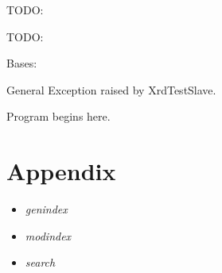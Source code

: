 \documentclass[a4paper,11pt,openany]{sphinxmanual}
\begin{document}
\begin{fulllineitems}
\begin{fulllineitems}
\label{ref-manual/XrdTestSlave:XrdTestSlave.XrdTestSlave.requestTags}
TODO:

\end{fulllineitems}


\begin{fulllineitems}
\label{ref-manual/XrdTestSlave:XrdTestSlave.XrdTestSlave.run}
TODO:

\end{fulllineitems}


\end{fulllineitems}


\begin{fulllineitems}
\label{ref-manual/XrdTestSlave:XrdTestSlave.XrdTestSlaveException}
Bases: 

General Exception raised by XrdTestSlave.

\end{fulllineitems}


\begin{fulllineitems}
\label{ref-manual/XrdTestSlave:XrdTestSlave.main}
Program begins here.

\end{fulllineitems}



\section{Appendix}
\label{index:appendix}\begin{itemize}
\item {} 
\emph{genindex}

\item {} 
\emph{modindex}

\item {} 
\emph{search}

\end{itemize}
\end{document}
